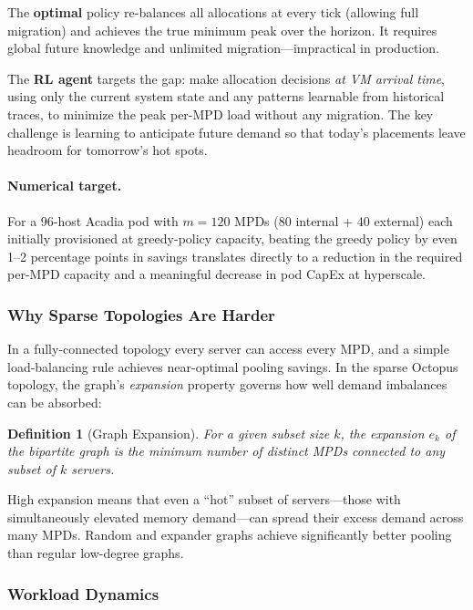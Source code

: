 \documentclass[11pt]{article}
\newtheorem{definition}{Definition}
\begin{document}
The \textbf{optimal} policy re-balances all allocations at every tick (allowing
full migration) and achieves the true minimum peak over the horizon.  It
requires global future knowledge and unlimited migration---impractical in
production.

The \textbf{RL agent} targets the gap: make allocation decisions \emph{at VM
arrival time}, using only the current system state and any patterns learnable
from historical traces, to minimize the peak per-MPD load without any
migration.  The key challenge is learning to anticipate future demand so that
today's placements leave headroom for tomorrow's hot spots.

\paragraph{Numerical target.}
For a 96-host Acadia pod with $m = 120$ MPDs (80 internal + 40 external) each
initially provisioned at greedy-policy capacity, beating the greedy policy by
even 1--2 percentage points in savings translates directly to a reduction in the
required per-MPD capacity and a meaningful decrease in pod CapEx at hyperscale.

\subsubsection*{Why Sparse Topologies Are Harder}

In a fully-connected topology every server can access every MPD, and a simple
load-balancing rule achieves near-optimal pooling savings.  In the sparse
Octopus topology, the graph's \emph{expansion} property governs how well
demand imbalances can be absorbed:

\begin{definition}[Graph Expansion]
For a given subset size $k$, the expansion $e_k$ of the bipartite graph is
the minimum number of distinct MPDs connected to any subset of $k$ servers.
\end{definition}

High expansion means that even a ``hot'' subset of servers---those with
simultaneously elevated memory demand---can spread their excess demand across
many MPDs.  Random and expander graphs achieve significantly better pooling
than regular low-degree graphs.

\subsubsection*{Workload Dynamics}
\end{document}

